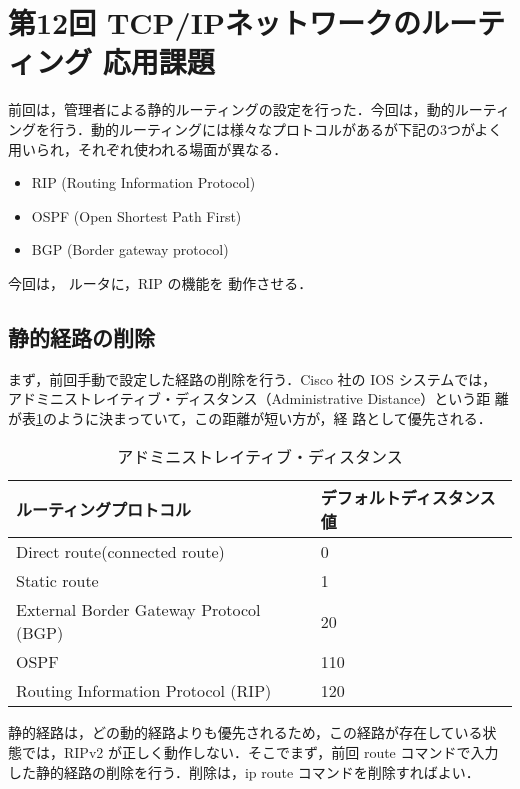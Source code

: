 \section{第12回 TCP/IPネットワークのルーティング 応用課題}

前回は，管理者による静的ルーティングの設定を行った．今回は，動的ルーティ
ングを行う．動的ルーティングには様々なプロトコルがあるが下記の3つがよく
用いられ，それぞれ使われる場面が異なる．

\begin{itemize}
\item RIP (Routing Information Protocol)
\item OSPF (Open Shortest Path First)
\item BGP (Border gateway protocol)
\end{itemize}

今回は，\textbf{} ルータに，RIP の機能を
動作させる．

\subsection*{静的経路の削除}

まず，前回手動で設定した経路の削除を行う．Cisco 社の IOS システムでは，
アドミニストレイティブ・ディスタンス（Administrative Distance）という距
離が表\ref{sp12:tab:ad-distance}のように決まっていて，この距離が短い方が，経
路として優先される．
\begin{table}[h]
 \caption{アドミニストレイティブ・ディスタンス}%
 \label{sp12:tab:ad-distance}
 \begin{center}
  \begin{tabular}{|l|l|}
    \hline
    ルーティングプロトコル & デフォルトディスタンス値\\
    \hline \hline
    Direct route(connected route) & 0\\
    \hline
    Static route & 1\\
    \hline
    External Border Gateway Protocol (BGP) & 20\\
    \hline
    OSPF & 110\\
    \hline
    Routing Information Protocol (RIP) & 120\\
    \hline
  \end{tabular}
 \end{center}
\end{table}

静的経路は，どの動的経路よりも優先されるため，この経路が存在している状
態では，RIPv2 が正しく動作しない．そこでまず，前回 route コマンドで入力
した静的経路の削除を行う．削除は，ip route コマンドを削除すればよい．

